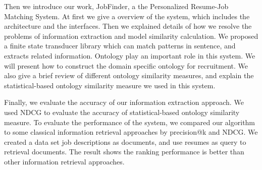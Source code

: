 Then we introduce our work, JobFinder, a the Personalized Resume-Job Matching System. At first we give a overview of the system, which includes the architecture and the interfaces. Then we explained details of how we resolve the problems of information extraction and model similarity calculation. We proposed a finite state transducer library which can match patterns in sentence, and extracts related information. Ontology play an important role in this system. We will present how to construct the domain specific ontology for recruitment. We also give a brief review of different ontology similarity measures, and explain the statistical-based ontology similarity measure we used in this system.

Finally, we evaluate the accuracy of our information extraction approach. We used NDCG to evaluate the accuracy of statistical-based ontology similarity measure. To evaluate the performance of the system, we compared our algorithm to some classical information retrieval approaches by precision@k and NDCG. We created a data set job descriptions as documents, and use resumes as query to retrieval documents. The result shows the ranking performance is better than other information retrieval approaches.

